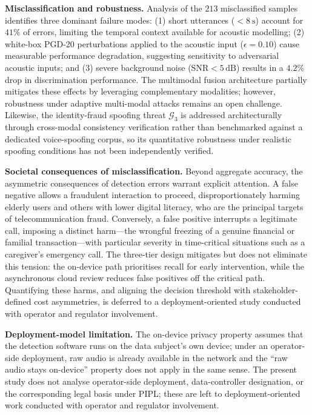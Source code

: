 \documentclass[a4paper,fleqn]{cas-sc}
\begin{document}
\textbf{Misclassification and robustness.}
Analysis of the $213$ misclassified samples identifies three dominant failure modes: (1) short utterances ($< 8~\text{s}$) account for $41\%$ of errors, limiting the temporal context available for acoustic modelling; (2) white-box PGD-20 perturbations applied to the acoustic input ($\epsilon = 0.10$) cause measurable performance degradation, suggesting sensitivity to adversarial acoustic inputs; and (3) severe background noise ($\text{SNR} < 5\,\text{dB}$) results in a $4.2\%$ drop in discrimination performance. The multimodal fusion architecture partially mitigates these effects by leveraging complementary modalities; however, robustness under adaptive multi-modal attacks remains an open challenge. Likewise, the identity-fraud spoofing threat $\mathcal{G}_3$ is addressed architecturally through cross-modal consistency verification rather than benchmarked against a dedicated voice-spoofing corpus, so its quantitative robustness under realistic spoofing conditions has not been independently verified.

\textbf{Societal consequences of misclassification.}
Beyond aggregate accuracy, the asymmetric consequences of detection errors warrant explicit attention. A false negative allows a fraudulent interaction to proceed, disproportionately harming elderly users and others with lower digital literacy, who are the principal targets of telecommunication fraud. Conversely, a false positive interrupts a legitimate call, imposing a distinct harm---the wrongful freezing of a genuine financial or familial transaction---with particular severity in time-critical situations such as a caregiver's emergency call. The three-tier design mitigates but does not eliminate this tension: the on-device path prioritises recall for early intervention, while the asynchronous cloud review reduces false positives off the critical path. Quantifying these harms, and aligning the decision threshold with stakeholder-defined cost asymmetries, is deferred to a deployment-oriented study conducted with operator and regulator involvement.

\textbf{Deployment-model limitation.} The on-device privacy property assumes that the detection software runs on the data subject's own device; under an operator-side deployment, raw audio is already available in the network and the ``raw audio stays on-device'' property does not apply in the same sense. The present study does not analyse operator-side deployment, data-controller designation, or the corresponding legal basis under PIPL; these are left to deployment-oriented work conducted with operator and regulator involvement.
\end{document}
